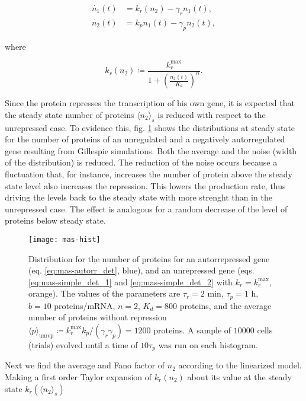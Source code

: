 \begin{equation}
  \label{eq:mas-autorr_det}
  \begin{split}
    \dot{n_1}(t) &= k_r(n_2) - \gamma_rn_1(t),\\
    \dot{n_2}(t) &= k_pn_1(t)-\gamma_pn_2(t),
  \end{split}
\end{equation}

where

\begin{equation*}
  k_r(n_2) \coloneqq \frac{k_r^{\text{max}}}{1+\left(\frac{n_2(t)}{K_d}\right)^n}.
\end{equation*}

Since the protein represses the transcription of his own gene, it is expected that the steady state number of proteins $\langle n_2\rangle_s$ is reduced with respect to the unrepressed case. To evidence this, fig. \ref{fig:mas-sim_hist} shows the distributions at steady state for the number of proteins of an unregulated and a negatively autorregulated gene resulting from Gillespie simulations. Both the average and the noise (width of the distribution) is reduced. The reduction of the noise occurs because a fluctuation that, for instance, increases the number of protein above the steady state level also increases the repression. This lowers the production rate, thus driving the levels back to the steady state with more strenght than in the unrepressed case. The effect is analogous for a random decrease of the level of proteins below steady state.

\begin{figure}[H]
  \centering
  \texttt{[image: mas-hist]}
  \caption[Histograms for protein number for a constitutive gene and a negatively autorregulated gene]{\label{fig:mas-sim_hist}Distribution for the number of proteins for an autorrepressed gene (eq. \ref{eq:mas-autorr_det}, blue), and an unrepressed gene (eqs. \ref{eq:mas-simple_det_1} and \ref{eq:mas-simple_det_2} with $k_r = k_r^\text{max}$, orange). The  values of the parameters are $\tau_r=2$ min, $\tau_p=1$ h, $b=10$ proteins/mRNA, $n=2$, $K_d=800$ proteins, and the average number of proteins without repression $\langle p\rangle_\text{unrep} \coloneqq k_r^\text{max}k_p/(\gamma_r\gamma_p) = 1200$ proteins. A sample of $10000$ cells (trials) evolved until a time of $10\tau_p$ was run on each histogram.}
\end{figure}

Next we find the average and Fano factor of $n_2$ according to the linearized model. Making a first order Taylor expansion of $k_r(n_2)$ about its value at the steady state $k_r(\langle n_2\rangle_s)$

